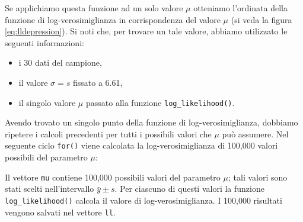 \documentclass[
  10pt,
  italian,
  a4paper,
  extrafontsizes,onecolumn,openright
  ]{memoir}
\newenvironment{Shaded}{\begin{snugshade}}{\end{snugshade}}
\newcommand{\AttributeTok}[1]{\textcolor[rgb]{0.77,0.63,0.00}{#1}}
\newcommand{\ConstantTok}[1]{\textcolor[rgb]{0.00,0.00,0.00}{#1}}
\newcommand{\ControlFlowTok}[1]{\textcolor[rgb]{0.13,0.29,0.53}{\textbf{#1}}}
\newcommand{\DecValTok}[1]{\textcolor[rgb]{0.00,0.00,0.81}{#1}}
\newcommand{\FloatTok}[1]{\textcolor[rgb]{0.00,0.00,0.81}{#1}}
\newcommand{\FunctionTok}[1]{\textcolor[rgb]{0.00,0.00,0.00}{#1}}
\newcommand{\NormalTok}[1]{#1}
\newcommand{\OtherTok}[1]{\textcolor[rgb]{0.56,0.35,0.01}{#1}}
\newcommand{\SpecialCharTok}[1]{\textcolor[rgb]{0.00,0.00,0.00}{#1}}
\providecommand{\tightlist}{%
  \setlength{\itemsep}{0pt}\setlength{\parskip}{0pt}}
\theoremstyle{definition}
\theoremstyle{definition}
\theoremstyle{definition}
\theoremstyle{definition}
\theoremstyle{remark}
\begin{document}
Se applichiamo questa funzione ad un solo valore \(\mu\) otteniamo l'ordinata della funzione di log-verosimiglianza in corrispondenza del valore \(\mu\) (si veda la figura \eqref{eq:lldepression}). Si noti che, per trovare un tale valore, abbiamo utilizzato le seguenti informazioni:

\begin{itemize}
\tightlist
\item
  i 30 dati del campione,
\item
  il valore \(\sigma = s\) fissato a 6.61,
\item
  il singolo valore \(\mu\) passato alla funzione \texttt{log\_likelihood()}.
\end{itemize}

Avendo trovato un singolo punto della funzione di log-verosimiglianza, dobbiamo ripetere i calcoli precedenti per tutti i possibili valori che \(\mu\) può assumere.
Nel seguente ciclo \texttt{for()} viene calcolata la log-verosimiglianza di 100,000 valori possibili del parametro \(\mu\):

\begin{Shaded}
\end{Shaded}

Il vettore \texttt{mu} contiene 100,000 possibili valori del parametro \(\mu\); tali valori sono stati scelti nell'intervallo \(\bar{y} \pm s\). Per ciascuno di questi valori la funzione \texttt{log\_likelihood()} calcola il valore di log-verosimiglianza. I 100,000 risultati vengono salvati nel vettore \texttt{ll}.
\end{document}

